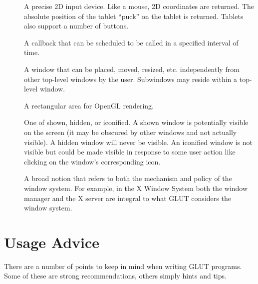 \documentclass[titlepage,twoside]{article}
\begin{document}
\begin{description}
\item[{\em {}}]  A precise 2D input device.  Like
a mouse, 2D coordinates are returned.  The absolute position of the
tablet ``puck'' on the tablet is returned.  Tablets also support
a number of buttons.
\item[{\em {}}]  A callback that can be scheduled to be called in
a specified interval of time.
\item[{\em {}}]  A window that can be placed, moved, resized,
etc. independently from other top-level windows by the user.
Subwindows may reside within a top-level window.
\item[{\em {}}]  A rectangular area for OpenGL rendering.
\item[{\em {}}]  One of shown, hidden, or iconified.
A shown window is potentially visible on the screen (it may be obscured
by other windows and not actually visible).  A hidden window will
never be visible.  An iconified window is not visible but could
be made visible in response to some user action like clicking on the
window's corresponding icon.
\item[{\em {}}]  A broad notion 
that refers to both the mechanism and policy of the window system.
For example, in the X Window System both the window manager and the
X server are integral to what GLUT considers the window system.
\end{description}



\section{Usage Advice}

There are a number of points to keep in mind when writing GLUT
programs.  Some of these are strong recommendations, others simply
hints and tips.
\end{document}
